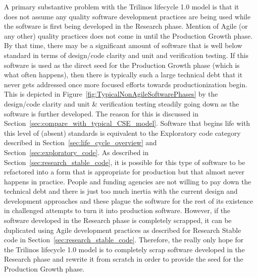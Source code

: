 \documentclass[11pt]{SANDreport}
\begin{document}
A primary substantive problem with the Trilinos lifecycle 1.0 model is
that it does not assume any quality software development practices are
being used while the software is first being developed in the Research
phase.  Mention of Agile (or any other) quality practices does not
come in until the Production Growth phase.  By that time, there may be
a significant amount of software that is well below standard in terms
of design/code clarity and unit and verification testing.  If this
software is used as the direct seed for the Production Growth phase
(which is what often happens), then there is typically such a large
technical debt that it never gets addressed once more focused efforts
towards productionization begin.  This is depicted in
Figure~\ref{fig:TypicalNonAgileSoftwarePhases} by the design/code
clarity and unit \& verification testing steadily going down as the
software is further developed.  The reason for this is discussed in
Section~\ref{sec:compare_with_typical_CSE_model}.  Software that
begins life with this level of (absent) standards is equivalent to the
Exploratory code category described in
Section~\ref{sec:life_cycle_overview} and
Section~\ref{sec:exploratory_code}.  As described in
Section~\ref{sec:research_stable_code}, it is possible for this type
of software to be refactored into a form that is appropriate for
production but that almost never happens in practice.  People and
funding agencies are not willing to pay down the technical debt and
there is just too much inertia with the current design and development
approaches and these plague the software for the rest of its existence
in challenged attempts to turn it into production software.  However,
if the software developed in the Research phase is completely
scrapped, it can be duplicated using Agile development practices as
described for Research Stable code in
Section~\ref{sec:research_stable_code}.  Therefore, the really only
hope for the Trilinos lifecycle 1.0 model is to completely scrap
software developed in the Research phase and rewrite it from scratch
in order to provide the seed for the Production Growth phase.
\end{document}
